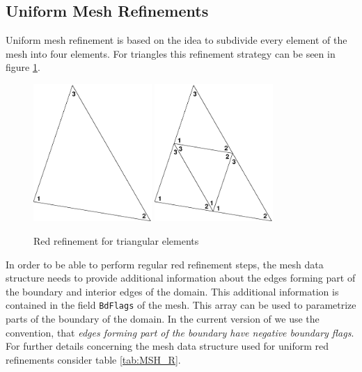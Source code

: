 \subsection{Uniform Mesh Refinements}
\label{sect:UMR}

 Uniform mesh refinement is based on the idea to subdivide every element of the mesh into four elements. For triangles this refinement strategy can be seen in figure \ref{fig:REG}.

\begin{figure}[htb]
  \centering
  \begin{minipage}[c]{0.8\textwidth}
    \includegraphics[width=0.4\textwidth]{REG_org.eps} \hfill
    \includegraphics[width=0.4\textwidth]{REG_ref.eps}
  \end{minipage}
  \caption{Red refinement for triangular elements}
  \label{fig:REG}
\end{figure}

In order to be able to perform regular red refinement steps, the mesh data structure needs to provide additional information
about the edges forming part of the boundary and interior edges of the domain. This additional information is contained in
the field {\tt BdFlags} of the mesh. This array can be used to parametrize parts of the boundary of the domain. In the current
version of \LIBNAME we use the convention, that {\em edges forming part of the boundary have negative boundary flags}. For further
details concerning the mesh data structure used for uniform red refinements consider table \ref{tab:MSH_R}.

